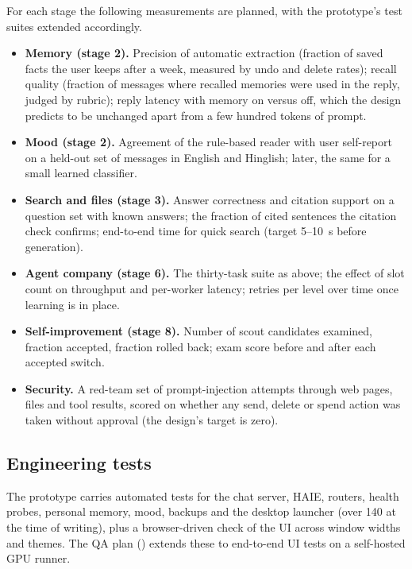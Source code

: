 For each stage the following measurements are planned, with the prototype's test suites extended accordingly.
\begin{itemize}
\item \textbf{Memory (stage 2).} Precision of automatic extraction (fraction of saved facts the user keeps after a week, measured by undo and delete rates); recall quality (fraction of messages where recalled memories were used in the reply, judged by rubric); reply latency with memory on versus off, which the design predicts to be unchanged apart from a few hundred tokens of prompt.
\item \textbf{Mood (stage 2).} Agreement of the rule-based reader with user self-report on a held-out set of messages in English and Hinglish; later, the same for a small learned classifier.
\item \textbf{Search and files (stage 3).} Answer correctness and citation support on a question set with known answers; the fraction of cited sentences the citation check confirms; end-to-end time for quick search (target 5--10~s before generation).
\item \textbf{Agent company (stage 6).} The thirty-task suite as above; the effect of slot count on throughput and per-worker latency; retries per level over time once  learning is in place.
\item \textbf{Self-improvement (stage 8).} Number of scout candidates examined, fraction accepted, fraction rolled back; exam score before and after each accepted switch.
\item \textbf{Security.} A red-team set of prompt-injection attempts through web pages, files and tool results, scored on whether any send, delete or spend action was taken without approval (the design's target is zero).
\end{itemize}

\subsection{Engineering tests}

The prototype carries automated tests for the chat server, HAIE, routers, health probes, personal memory, mood, backups and the desktop launcher (over 140 at the time of writing), plus a browser-driven check of the UI across window widths and themes. The QA plan () extends these to end-to-end UI tests on a self-hosted GPU runner.

